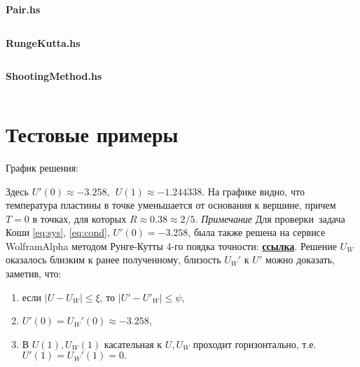 \documentclass[a4paper,12pt]{article}
\begin{document}
\textbf{Pair.hs}
\inputminted[breaklines]{haskell}{../src/Pair.hs}

\textbf{RungeKutta.hs}
\inputminted[breaklines]{haskell}{../src/RungeKutta.hs}

\textbf{ShootingMethod.hs}
\inputminted[breaklines]{haskell}{../src/ShootingMethod.hs}
\pagebreak
\section{\normalsize{Тестовые примеры}}
\begin{flushleft}
  График решения:\linebreak
\end{flushleft}
\begin{figure}[h]
  \centering
  \def\svgwidth{\columnwidth}
  
\end{figure}

Здесь $U'(0) \approx -3.258,~~U(1) \approx -1.244338$.\newline\linebreak
На графике видно, что температура пластины в точке уменьшается от основания к вершине, причем $T = 0$ в точках, для которых $R \approx 0.38 \approx 2/5$.
\linebreak\linebreak
\textit{Примечание}\linebreak
Для проверки~задача Коши \eqref{eq:sys}, \eqref{eq:cond}, $U'(0) = -3.258$, была также решена на сервисе WolframAlpha методом Рунге-Кутты 4-го поядка точности: \href{https://www.wolframalpha.com/input/?i=Runge-Kutta+method%2C+d%5E2u%2Fdr%5E2+%3D+0.4*u%5E4%2F%28%281-r%29*tg6%2B0.05%29-%281%2F%28r%2B0.5%29-tg6%2F%28%281-r%29*tg6%2B0.05%29%29du%2Fdr%2C+u%280%29+%3D+1%2C+u%27%280%29+%3D+-3.258+from+0+to+1%2C+h+%3D+.001}{\textbf{ссылка}}.
\linebreak\linebreak
Решение $U_W$ оказалось близким к ранее полученному, близость $U_W'$ к $U'$ можно доказать, заметив, что:
  \begin{enumerate}
    \item если $\mathopen|U-U_W\mathclose| \le \xi$, то $\mathopen|U'-U'_W\mathclose| \le \psi$,
    \item $U'(0) = U_W'(0) \approx -3.258$,
    \item В $U(1), U_W(1)$ касательная к $U, U_W$ проходит горизонтально, т.е. $U'(1)=U_W'(1)=0.$
  \end{enumerate} 
\end{document}
